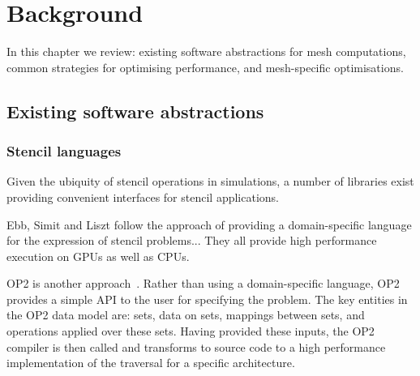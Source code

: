 \section{Background}

In this chapter we review: existing software abstractions for mesh computations, common strategies for optimising performance, and mesh-specific optimisations.

\subsection{Existing software abstractions}

\subsubsection{Stencil languages}
\label{sec:stencillang}


Given the ubiquity of stencil operations in simulations, a number of libraries exist providing convenient interfaces for stencil applications.


Ebb, Simit and Liszt follow the approach of providing a domain-specific language for the expression of stencil problems...
They all provide high performance execution on GPUs as well as CPUs.


OP2 is another approach~\cite{mudaligeOP2ActiveLibrary2012,mudaligeDesignInitialPerformance2013}.
Rather than using a domain-specific language, OP2 provides a simple API to the user for specifying the problem.
The key entities in the OP2 data model are: sets, data on sets, mappings between sets, and operations applied over these sets.
Having provided these inputs, the OP2 compiler is then called and transforms to source code to a high performance implementation of the traversal for a specific architecture.


